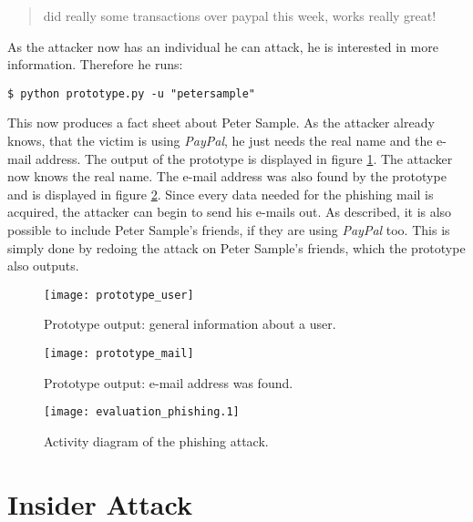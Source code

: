 \begin{quote}
did really some transactions over paypal this week, works really great!
\end{quote}

As the attacker now has an individual he can attack, he is interested in more
information. Therefore he runs:

\lstset{language=bash}
\begin{lstlisting}
$ python prototype.py -u "petersample"
\end{lstlisting}

This now produces a fact sheet about Peter Sample. As the attacker already
knows, that the victim is using \textit{PayPal}, he just needs the real name
and the e-mail address. The output of the prototype is displayed in figure
\ref{fig:prototype_user}. The attacker now knows the real name. The e-mail
address was also found by the prototype and is displayed in figure
\ref{fig:prototype_mail}. Since every data needed for the phishing mail is
acquired, the attacker can begin to send his e-mails out. As described,
it is also possible to include Peter Sample's friends, if they are using
\textit{PayPal} too. This is simply done by redoing the attack on Peter
Sample's friends, which the prototype also outputs.

\begin{figure}[htb]
  \begin{center}
    \texttt{[image: prototype\_user]}
    \caption{Prototype output: general information about a user.}
    \label{fig:prototype_user}
  \end{center}
\end{figure}

\begin{figure}[htb]
  \begin{center}
    \texttt{[image: prototype\_mail]}
    \caption{Prototype output: e-mail address was found.}
    \label{fig:prototype_mail}
  \end{center}
\end{figure}

\begin{figure}[ht]
  \begin{center}
    \texttt{[image: evaluation\_phishing.1]}
    \label{fig:evaluation_phishing}
    \caption{Activity diagram of the phishing attack.}
  \end{center}
\end{figure}

\section{Insider Attack}

